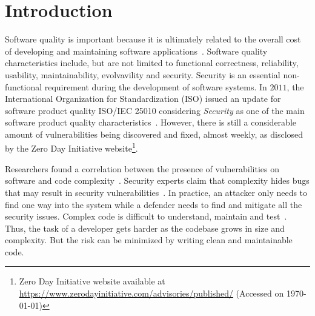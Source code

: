 \documentclass[smallextended]{svjour3}       %
\begin{document}
\section{Introduction}
%
Software quality is important because it is ultimately related to 
the overall cost of developing and maintaining software 
applications~\cite{slaughter1998evaluating}. Software quality 
characteristics include, but are not limited to functional 
correctness, reliability, usability, maintainability, evolvavility 
and security. Security is an essential non-functional requirement 
during the development of software systems. In $2011$, the 
International Organization for Standardization (ISO) issued an 
update for software product quality ISO/IEC 25010 considering 
\emph{Security} as one of the main software product quality 
characteristics~\cite{iso:2011}. However, there is still 
a considerable amount of vulnerabilities being discovered and fixed, 
almost weekly, as disclosed by the Zero Day Initiative 
website\footnote{Zero Day Initiative website available at 
\url{https://www.zerodayinitiative.com/advisories/published/} 
(Accessed on \today{})}. 

Researchers found a correlation between the presence of 
vulnerabilities on software and code complexity~\cite{shin2010evaluating,10.1145/1774088.1774504}. 
Security experts claim that complexity hides bugs that may result in 
security vulnerabilities~\cite{mcgraw2004software,schneier2006beyond}. In 
practice, an attacker only needs to find one way into the system 
while a defender needs to find and mitigate all the security issues. 
Complex code is difficult to understand, maintain and 
test~\cite{1702388}. Thus, the task of a developer gets harder as the 
codebase grows in size and complexity. But the risk can be minimized 
by writing clean and maintainable code. 
\end{document}
